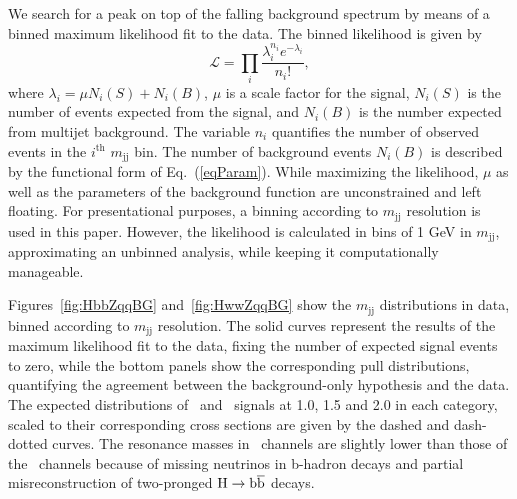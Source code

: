 We search for a peak on top of the falling background spectrum by
means of a binned maximum likelihood fit to the data. 
The binned likelihood is given by
\begin{equation} \mathcal{L} = \prod_{i}
  \frac{\lambda_{i}^{n_{i}} e^{-\lambda_{i}}}{n_{i}!},
\end{equation}
where ${\lambda_{i}} = {\mu}{N_{i}(S)} + {N_{i}(B)}$,
$\mu$ is a scale factor for the signal, $N_i(S)$ is the number
of events expected from the signal, 
and $N_i(B)$ is the number expected from
multijet background. The variable 
$n_i$ quantifies the number of observed
events in the $i^\mathrm{th}$ $m_\mathrm{jj}$ bin.
The number of background events 
$N_i(B)$ is described by the functional form of
Eq.~(\ref{eqParam}). 
While maximizing the likelihood, 
$\mu$ as well as the parameters of the background
function are unconstrained and left floating.
For presentational purposes, a binning according to $m_\mathrm{jj}$ resolution 
is used in this paper.  However, the likelihood is calculated
in bins of 1 GeV in $m_\mathrm{jj}$, 
approximating an unbinned analysis,
while keeping it computationally manageable.

Figures~\ref{fig:HbbZqqBG} and~\ref{fig:HwwZqqBG} 
show the $m_\mathrm{jj}$ distributions in data, binned according to
$m_\mathrm{jj}$ resolution.   
The solid
curves represent the results of the maximum likelihood fit to the data,
fixing the number of expected signal events to zero, while the bottom
panels show the corresponding pull distributions, quantifying the
agreement between the background-only hypothesis and the data.
The expected distributions of \HbbVqq~and \HwwVqq~signals at 
1.0, 1.5 and 2.0 \TeVcc in each category, 
scaled to their corresponding cross sections  
are given by the dashed and dash-dotted
curves.
The resonance masses in \HbbAll\ channels are slightly lower than 
those of the \HWWAll\ channels because of missing
neutrinos in b-hadron decays
and partial misreconstruction of two-pronged ${\rm H\to\mathrm{b\overline{b}}}$ decays. 



